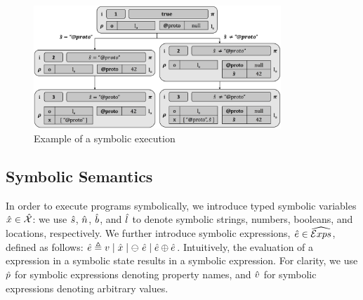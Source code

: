 \begin{figure}[!t]
\centering
\includegraphics[width=0.83\textwidth]{figures/symbSemEx.png}
\vspace*{-0.1cm}
\caption{Example of a \cosette symbolic execution}
\label{fig:sexecexample}
\vspace*{-0.3cm}
\end{figure}


\subsection{Symbolic Semantics}
In order to execute \jsil programs symbolically, we introduce typed symbolic variables $\hat{x} \in \hat{\mathcal{X}}$: 
we use $\hat{s}$, $\hat{n}$, $\hat{b}$, and $\hat{l}$ to denote symbolic strings, numbers, 
booleans, and locations, respectively. We further introduce symbolic expressions, $\hat{e} \in \widehat{\text{$\mathcal{E}xps$}}$, defined as follows: 
$\hat{e} \triangleq v \mid \hat{x} \mid \ominus\ \hat{e} \mid \hat{e} \oplus \hat{e}$. 
Intuitively, the evaluation of a \jsil expression in a symbolic state results in a symbolic expression. 
For clarity, we use $\hat{p}$ for symbolic expressions denoting property names, and $\hat{v}$ for symbolic
expressions denoting arbitrary values. 


